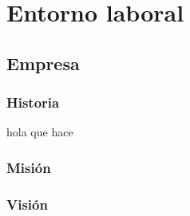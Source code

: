 \documentclass[protocolo.tex]{subfiles}
\begin{document}
\section{Entorno laboral}

\subsection{Empresa}

\subsubsection{Historia}
hola que hace
\subsubsection{Misión}

\subsubsection{Visión}
\end{document}
